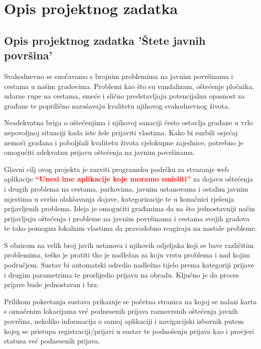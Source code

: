 \chapter{Opis projektnog zadatka}

\section{Opis projektnog zadatka 'Štete javnih površina'}

\noindent Svakodnevno se suočavamo s brojnim problemima na javnim površinama i cestama u našim gradovima. Problemi kao što su vandalizam, oštećenje pločnika, udarne rupe na cestama, smeće i slično predstavljaju potencijalnu opasnost za građane te poprilično narušavaju kvalitetu njihovog svakodnevnog života.

\noindent Neadekvatna briga o oštećenjima i njihovoj sanaciji često ostavlja građane u vrlo nepovoljnoj situaciji kada iste žele prijaviti vlastima. Kako bi suzbili osjećaj nemoći građana i poboljšali kvalitetu života cjelokupne zajednice, potrebno je omogućiti adekvatnu prijavu oštećenja na javnim površinama.

\noindent Glavni cilj ovog projekta je razviti programsku podršku za stvaranje web aplikacije
\textcolor{red}{\textbf{“Unesi ime aplikacije koje moramo smisliti”}} za dojavu oštećenja i drugih problema na cestama, parkovima, javnim ustanovama i ostalim javnim mjestima u svrhu olakšavanja dojave, kategorizacije te u konačnici rješenja prijavljenih problema. Ideja je omogućiti građanima da na što jednostavniji način prijavljuju oštećenja i probleme na javnim površinama i cestama svojih gradova te tako pomognu lokalnim vlastima da pravodobno reagiraju na nastale probleme.

\noindent S obzirom na velik broj javih ustanova i njihovih odjeljaka koji se bave različitim problemima, teško je pratiti tko je nadležan za koju vrstu problema i nad kojim područjem. Sustav bi automatski odredio nadležno tijelo prema kategoriji prijave i drugim parametrima te proslijedio prijavu na obradu. Ključno je da proces prijave bude jednostavan i brz.

\noindent Prilikom pokretanja sustava prikazuje se početna stranica na kojoj se nalazi karta s označenim lokacijama već podnesenih prijava raznovrsnih oštećenja javnih površina, nekoliko informacija o samoj aplikaciji i navigacijski izbornik putem kojeg se pristupa registraciji/prijavi u sustav te podnošenju prijava kao i provjeri statusa već podnesenih prijava.

